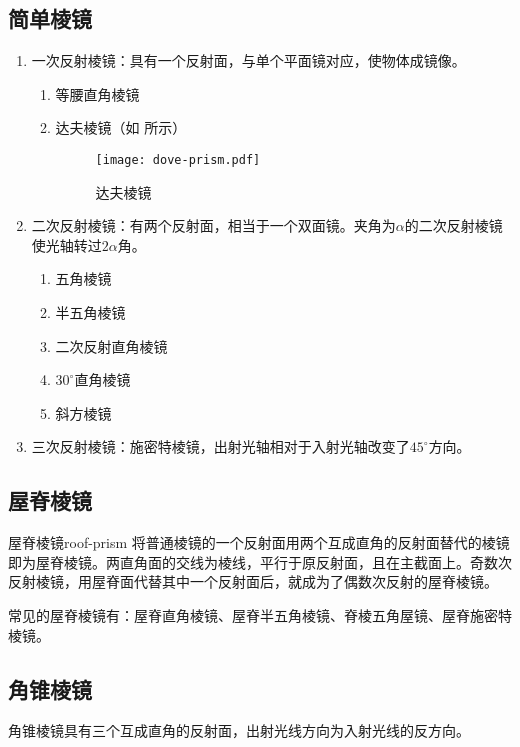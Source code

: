 \documentclass[cn,10pt,chinesefont=founder,math=newtx,cite=super,twoside]{elegantbook}
\begin{document}
\subsection{简单棱镜}

\begin{enumerate}
	\item 一次反射棱镜：具有一个反射面，与单个平面镜对应，使物体成镜像。
	\begin{enumerate}
		\item 等腰直角棱镜
		\item 达夫棱镜（如 所示）
		\begin{figure}[htbp]
			\centering
			\texttt{[image: dove-prism.pdf]}
			\caption{达夫棱镜}
			\label{fig:dove-prism}
		\end{figure}
	\end{enumerate}
	\item 二次反射棱镜：有两个反射面，相当于一个双面镜。夹角为$\alpha$的二次反射棱镜使光轴转过$2\alpha$角。
	\begin{enumerate}
		\item 五角棱镜
		\item 半五角棱镜
		\item 二次反射直角棱镜
		\item $30^{\circ}$直角棱镜
		\item 斜方棱镜
	\end{enumerate}
	\item 三次反射棱镜：施密特棱镜，出射光轴相对于入射光轴改变了$45^{\circ}$方向。
\end{enumerate}

\subsection{屋脊棱镜}

\begin{definition}{屋脊棱镜}{roof-prism}
	将普通棱镜的一个反射面用两个互成直角的反射面替代的棱镜即为屋脊棱镜。两直角面的交线为棱线，平行于原反射面，且在主截面上。奇数次反射棱镜，用屋脊面代替其中一个反射面后，就成为了偶数次反射的屋脊棱镜。
\end{definition}

常见的屋脊棱镜有：屋脊直角棱镜、屋脊半五角棱镜、脊棱五角屋镜、屋脊施密特棱镜。

\subsection{角锥棱镜}
角锥棱镜具有三个互成直角的反射面，出射光线方向为入射光线的反方向。
\end{document}
